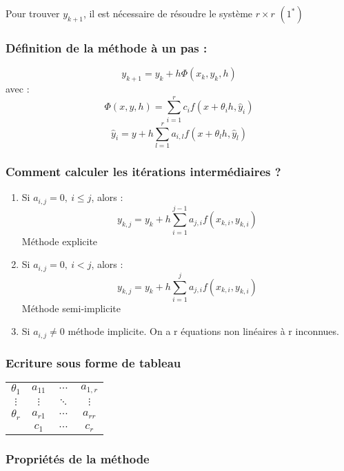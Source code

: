 Pour trouver $y_{k+1}$, il est nécessaire de résoudre le système $r\times r$ $(1^*)$

\subsubsection{Définition de la méthode à un pas :}
\[y_{k+1}=y_k+h\Phi(x_k,y_k,h)\]
avec :
\[\Phi(x,y,h)=\sum_{i=1}^r c_i f(x+\theta_i h, \hat{y}_i)\]
\[\hat{y}_i=y+h\sum_{l=1}^r a_{i,l}f(x+\theta_l h, \hat{y}_l)\]

\subsubsection{Comment calculer les itérations intermédiaires ?}
\begin{enumerate}
	\item Si $a_{i,j}=0,\ i\leq j$, alors :
		\[y_{k,j}=y_k+h\sum_{i=1}^{j-1} a_{j,i}f(x_{k,i},y_{k,i})\]
		Méthode explicite

	\item Si $a_{i,j}=0,\ i<j$, alors :
		\[y_{k,j}=y_k+h\sum_{i=1}^j a_{j,i}f(x_{k,i},y_{k,i})\]
		Méthode semi-implicite

	\item Si $a_{i,j}\neq0$ méthode implicite. On a r équations non linéaires à r inconnues.
\end{enumerate}

\subsubsection{Ecriture sous forme de tableau}
\begin{center}\begin{tabular}{c|c c c}
	$\theta_1$ & $a_{11}$ & $\cdots$ & $a_{1,r}$ \\
	$\vdots$ & $\vdots$ & $\ddots$ & $\vdots$ \\
	$\theta_r$ & $a_{r1}$ & $\cdots$ & $a_{rr}$ \\
	\hline
	           & $c_1$ & $\cdots$ & $c_r$ 
\end{tabular}\end{center}

\subsubsection{Propriétés de la méthode}

\begin{dem}

\end{dem}

